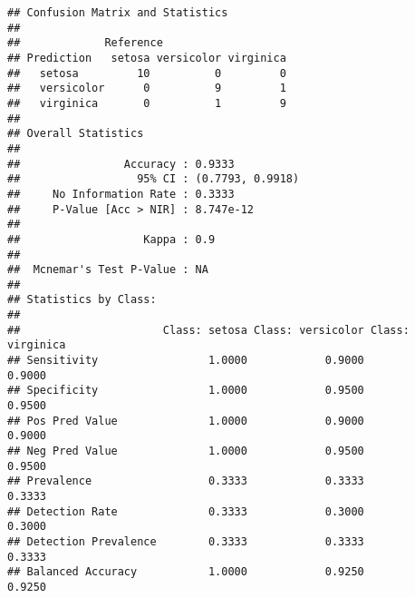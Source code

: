 \documentclass[
]{article}
\begin{document}
\begin{verbatim}
## Confusion Matrix and Statistics
## 
##             Reference
## Prediction   setosa versicolor virginica
##   setosa         10          0         0
##   versicolor      0          9         1
##   virginica       0          1         9
## 
## Overall Statistics
##                                           
##                Accuracy : 0.9333          
##                  95% CI : (0.7793, 0.9918)
##     No Information Rate : 0.3333          
##     P-Value [Acc > NIR] : 8.747e-12       
##                                           
##                   Kappa : 0.9             
##                                           
##  Mcnemar's Test P-Value : NA              
## 
## Statistics by Class:
## 
##                      Class: setosa Class: versicolor Class: virginica
## Sensitivity                 1.0000            0.9000           0.9000
## Specificity                 1.0000            0.9500           0.9500
## Pos Pred Value              1.0000            0.9000           0.9000
## Neg Pred Value              1.0000            0.9500           0.9500
## Prevalence                  0.3333            0.3333           0.3333
## Detection Rate              0.3333            0.3000           0.3000
## Detection Prevalence        0.3333            0.3333           0.3333
## Balanced Accuracy           1.0000            0.9250           0.9250
\end{verbatim}
\end{document}
